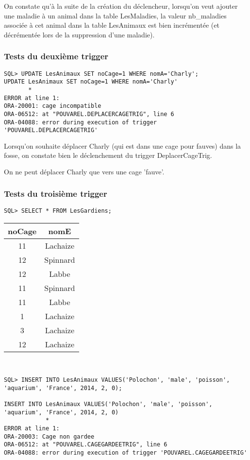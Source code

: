 \documentclass{article}
\begin{document}
On constate qu'à la suite de la création du déclencheur, lorsqu'on veut ajouter une maladie à un animal dans la table LesMaladies, la valeur nb\_maladies associée à cet animal dans la table LesAnimaux est bien incrémentée (et décrémentée lors de la suppression d'une maladie).\\

\subsubsection*{Tests du deuxième trigger}
\begin{lstlisting}
SQL> UPDATE LesAnimaux SET noCage=1 WHERE nomA='Charly';
UPDATE LesAnimaux SET noCage=1 WHERE nomA='Charly'
       *
ERROR at line 1:
ORA-20001: cage incompatible
ORA-06512: at "POUVAREL.DEPLACERCAGETRIG", line 6
ORA-04088: error during execution of trigger 'POUVAREL.DEPLACERCAGETRIG'
\end{lstlisting}

Lorsqu'on souhaite déplacer Charly (qui est dans une cage pour fauves) dans la fosse, on constate bien le déclenchement du trigger DeplacerCageTrig.

On ne peut déplacer Charly que vers une cage 'fauve'.\\

\subsubsection*{Tests du troisième trigger}
\begin{lstlisting}
SQL> SELECT * FROM LesGardiens;
\end{lstlisting}
\begin{tabular}{|cc|}
noCage & nomE \\
\hline
11 & Lachaize \\
12 & Spinnard \\
12 & Labbe \\
11 & Spinnard \\
11 & Labbe \\
1 & Lachaize \\
3 & Lachaize \\
12 & Lachaize \\
\end{tabular}\\

\begin{lstlisting}
SQL> INSERT INTO LesAnimaux VALUES('Polochon', 'male', 'poisson', 'aquarium', 'France', 2014, 2, 0);

INSERT INTO LesAnimaux VALUES('Polochon', 'male', 'poisson', 'aquarium', 'France', 2014, 2, 0)
            *
ERROR at line 1:
ORA-20003: Cage non gardee
ORA-06512: at "POUVAREL.CAGEGARDEETRIG", line 6
ORA-04088: error during execution of trigger 'POUVAREL.CAGEGARDEETRIG'
\end{lstlisting}
\end{document}
